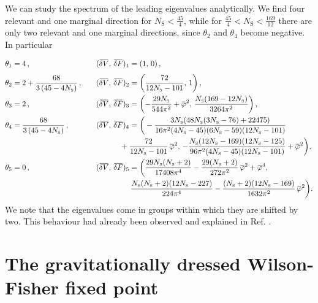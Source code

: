 \documentclass[11pt]{book}
\newcommand{\overbar}[1]{\mkern 1.5mu\overline{\mkern-1.5mu#1\mkern-1.5mu}\mkern 1.5mu}
\newcommand\NS{ N_{\scriptscriptstyle{\mathrm{S}}} }
\newcommand{\deltaV}{\overbar {\delta V}}
\newcommand{\deltaF}{\overbar {\delta F}}
\newcommand{\bp}{\overbar \varphi}
\numberwithin{equation}{chapter}
\begin{document}
We can study the spectrum of the leading eigenvalues analytically.
We find four relevant and one marginal direction for $\NS<\frac{45}{4}$,
while for $\frac{45}{4}<\NS<\frac{169}{12}$ there are only two relevant and one marginal directions,
since $\theta_2$ and $\theta_4$ become negative. In particular
\begin{alignat}{2}
  \theta_1 &= 4 \,,                                      && (\deltaV, \, \deltaF)_1 = \vphantom{\frac 11} (1, \, 0) \,, \nonumber \\
  \theta_2 &= 2 + \frac{68}{3 \, (45 - 4\NS)} \,, \quad  && (\deltaV, \, \deltaF)_2 = \left( \frac{72}{12 \NS - 101}, \, 1 \right)  , \nonumber\\
  \theta_3 &= 2 \,,                                      && (\deltaV, \, \deltaF)_3 = \left( -\frac{29 \NS}{544\pi^2} + \bp^2, \, \frac{\NS(169 - 12 \NS)}{3264\pi^2}\right) , \nonumber\\
  \theta_4 &=     \frac{68}{3 \, (45 - 4\NS)} \,,        && (\deltaV, \, \deltaF)_4 = \bigg( -\frac{3\NS(48\NS(3 \NS - 76)+22475)}{16\pi^2(4\NS - 45)(6\NS - 59) (12\NS - 101)} \nonumber \\
                                                       & && \hspace{1.1cm} + \frac{72}{12\NS - 101} \, \bp^2, \,  - \frac{\NS(12\NS - 169)(12\NS-125)} {96\pi^2(4\NS - 45)(12 \NS - 101)}+\bp^2\bigg) , \nonumber \\
  \theta_5 &= 0 \,,                                      && (\deltaV, \, \deltaF)_5 = \bigg( \frac{29 \NS (\NS+2)}{17408\pi^4} - \frac{29(\NS+2)}{272\pi ^2} \, \bp^2 + \bp^4, \nonumber \\
                                                       & && \hspace{1.6cm} \frac{\NS (\NS+2) (12 \NS - 227)}{224\pi ^4}-\frac{(\NS+2) (12 \NS - 169) }{1632\pi^2} \, \bp^2 \bigg) .
\end{alignat}
We note that the eigenvalues come in groups
within which they are shifted by two.
This behaviour had already been observed and
explained in Ref. \cite{Narain:2009fy}.


\section{The gravitationally dressed Wilson-Fisher fixed point}
\end{document}
